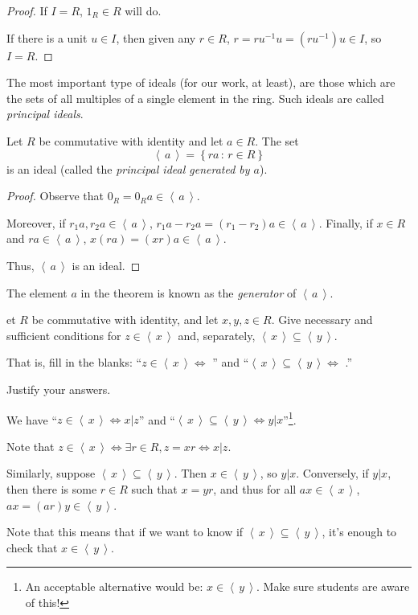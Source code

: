 \documentclass[english,course]{lecture}
\newcommand{\ideal}[1]{\left\langle\, #1 \,\right\rangle}
\theoremstyle{plain}
\newenvironment{question}[1]
  {\renewcommand\theinnerquestion{#1}\innerquestion}
  {\endinnerquestion}
\def\setof#1#2{{\left\{#1\,\colon\,#2\right\}}}
\def\presnotes{}
\begin{document}
\begin{proof}
	If $I = R$, $1_R\in R$ will do.
	
	If there is a unit $u\in I$, then given any $r\in R$, $r = r u^{-1} u = (ru^{-1}) u \in I$, so $I = R$.
\end{proof}

\presnotes

The most important type of ideals (for our work, at least), are those which are the sets of all multiples of a single element in the ring.
Such ideals are called \emph{principal ideals}.

\begin{theorem}
	Let $R$ be commutative with identity and let $a\in R$.
	The set
	\[
		\ideal{a} = \setof{ra}{r\in R}
	\]
	is an ideal (called the \emph{principal ideal generated by $a$}).
\end{theorem}

\begin{proof}
	Observe that $0_R = 0_R a \in \ideal{a}$.
	
	Moreover, if $r_1 a, r_2 a\in \ideal{a}$, $r_1 a - r_2 a = (r_1 - r_2)a \in \ideal{a}$.
	Finally, if $x\in R$ and $r a\in \ideal{a}$, $x (ra) = (xr) a \in \ideal{a}$.
	
	Thus, $\ideal{a}$ is an ideal.
\end{proof}

\presnotes

The element $a$ in the theorem is known as the \emph{generator} of $\ideal{a}$.

\begin{question}
	Let $R$ be commutative with identity, and let $x,y,z\in R$.
	Give necessary and sufficient conditions for $z\in \ideal{x}$ and, separately, $\ideal{x} \subseteq \ideal{y}$.
	
	That is, fill in the blanks: ``$z\in \ideal{x} \Leftrightarrow$ \makebox[0.75in]{\hrulefill}'' and ``$\ideal{x}\subseteq \ideal{y} \Leftrightarrow$ \makebox[0.75in]{\hrulefill}.''
	
	Justify your answers.
\end{question}

\begin{answer}
	We have ``$z\in \ideal{x} \Leftrightarrow x|z$'' and ``$\ideal{x}\subseteq \ideal{y} \Leftrightarrow y|x$''\footnote{An acceptable alternative would be: $x\in \ideal{y}$. Make sure students are aware of this!}.
	
	Note that $z\in \ideal{x} \Leftrightarrow \exists r\in R, z = xr \Leftrightarrow x|z$.
	
	Similarly, suppose $\ideal{x}\subseteq \ideal{y}$. Then $x\in \ideal{y}$, so $y|x$. %
	Conversely, if $y|x$, then there is some $r\in R$ such that $x = yr$, and thus for all $ax\in \ideal{x}$, $ax = (ar)y \in \ideal{y}$.
	
	Note that this means that if we want to know if $\ideal{x}\subseteq \ideal{y}$, it's enough to check that $x\in \ideal{y}$.
\end{answer}
\end{document}
